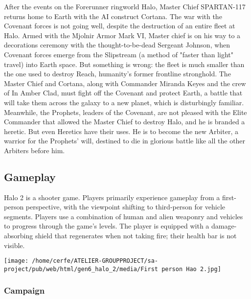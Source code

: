 \documentclass[a4paper,10pt]{book}
\begin{document}
          After the events on the Forerunner ringworld Halo, Master Chief SPARTAN-117 returns home to Earth with the AI construct Cortana.
          The war with the Covenant forces is not going well, despite the destruction of an entire fleet at Halo.
          Armed with the Mjolnir Armor Mark VI, Master chief is on his way to a decorations ceremony with the thought-to-be-dead Sergeant Johnson, when Covenant forces emerge 
          from the Slipstream (a method of "faster than light" travel) into Earth space.
          But something is wrong: the fleet is much smaller than the one used to destroy Reach, humanity's former frontline stronghold. The Master Chief and Cortana,
          along with Commander Miranda Keyes and the crew of In Amber Clad, must fight off the Covenant and protect Earth, a battle that will take them across the galaxy to a new planet,
          which is disturbingly familiar. Meanwhile, the Prophets, leaders of the Covenant, are not pleased with the Elite Commander that allowed the Master Chief to destroy Halo, and he is branded a heretic.
          But even Heretics have their uses. He is to become the new Arbiter, a warrior for the Prophets' will, destined to die in glorious battle like all the other Arbiters before him.
         
 
 \subsection{ Gameplay }
 
          Halo 2 is a shooter game. Players primarily experience gameplay from a first-person perspective, with the viewpoint shifting to third-person for vehicle segments.
          Players use a combination of human and alien weaponry and vehicles to progress through the game's levels. The player is equipped with a damage-absorbing shield that
          regenerates when not taking fire; their health bar is not visible.
         
 \texttt{[image: /home/cerfe/ATELIER-GROUPPROJECT/sa-project/pub/web/html/gen6\_halo\_2/media/First person Hao 2.jpg]}
 
 \subsubsection{ Campaign }
 
\end{document}

